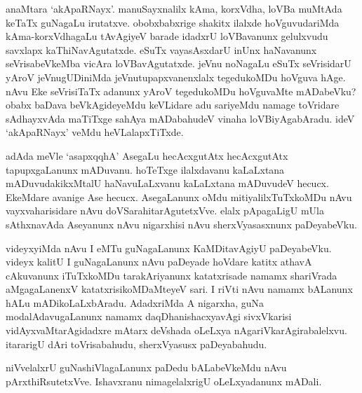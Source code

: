 anaMtara `akApaRNayx'. manuSayxnalilx kAma, korxVdha, loVBa muMtAda keTaTx guNagaLu irutatxve. obobxbabxrige shakitx ilalxde hoVguvudariMda 
kAma-korxVdhagaLu tAvAgiyeV barade idadxrU loVBavanunx gelulxvudu savxlapx kaThiNavAgutatxde. eSuTx vayasAsxdarU inUnx haNavanunx 
seVrisabeVkeMba vicAra loVBavAgutatxde. jeVnu noNagaLu eSuTx seVrisidarU yAroV jeVnugUDiniMda jeVnutupapxvanenxlalx 
tegedukoMDu hoVguva hAge. nAvu Eke seVrisiTaTx adanunx yAroV tegedukoMDu hoVguvaMte mADabeVku? obabx baDava 
beVkAgideyeMdu keVLidare adu sariyeMdu namage toVridare sAdhayxvAda maTiTxge sahAya mADabahudeV vinaha loVBiyAgabAradu. ideV `akApaRNayx' veMdu heVLalapxTiTxde.

adAda meVle `asapxqqhA' AsegaLu hecAcxgutAtx hecAcxgutAtx tapupxgaLanunx mADuvanu. hoTeTxge ilalxdavanu kaLaLxtana mADuvudakikxMtalU 
haNavuLaLxvanu kaLaLxtana mADuvudeV hecucx. EkeMdare avanige Ase hecucx. AsegaLanunx oMdu mitiyalilxTuTxkoMDu nAvu vayxvaharisidare nAvu 
doVSarahitarAgutetxVve. elalx pApagaLigU mUla sAthxnavAda Aseyanunx nAvu nigarxhisi nAvu sherxVyasasxnunx paDeyabeVku.

videyxyiMda nAvu I eMTu guNagaLanunx KaMDitavAgiyU paDeyabeVku. videyx kalitU I guNagaLanunx nAvu paDeyade hoVdare katitx athavA 
cAkuvanunx iTuTxkoMDu tarakAriyanunx katatxrisade namamx shariVrada aMgagaLanenxV katatxrisikoMDaMteyeV sari. I riVti nAvu namamx bALanunx 
hALu mADikoLaLxbAradu. AdadxriMda A nigarxha, guNa modalAdavugaLanunx namamx daqDhanishacxyavAgi sivxVkarisi vidAyxvaMtarAgidadxre mAtarx 
deVshada oLeLxya nAgariVkarAgirabalelxvu. itararigU dAri toVrisabahudu, sherxVyasusx paDeyabahudu.

niVvelalxrU guNashiVlagaLanunx paDedu bALabeVkeMdu nAvu pArxthiRsutetxVve. Ishavxranu nimagelalxrigU oLeLxyadanunx mADali.


\endchapter
